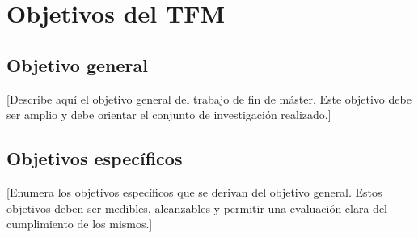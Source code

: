\chapter{Objetivos del TFM}

\section{Objetivo general}

[Describe aquí el objetivo general del trabajo de fin de máster. Este objetivo debe ser amplio y
debe orientar el conjunto de investigación realizado.]

\section{Objetivos específicos}

[Enumera los objetivos específicos que se derivan del objetivo general. Estos objetivos deben ser
medibles, alcanzables y permitir una evaluación clara del cumplimiento de los mismos.]
